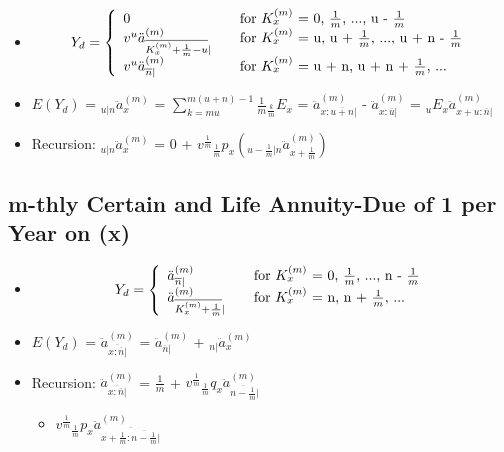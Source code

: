 \documentclass[]{book}
\providecommand{\tightlist}{%
  \setlength{\itemsep}{0pt}\setlength{\parskip}{0pt}}
\begin{document}
\begin{itemize}
\item
  \[Y_d = \left\{
    \begin{array}{l l l}
      0                      & \quad \text{for $K^{(m)}_x$ = 0, $\frac{1}{m}$, ..., u - $\frac{1}{m}$}\\
      v^u \ddot{a}^{(m)}_{\overline{K^{(m)}_x + \frac{1}{m} - u}| }                 & \quad \text{for $K^{(m)}_x$ = u, u + $\frac{1}{m}$, ..., u + n - $\frac{1}{m}$}\\
      v^u \ddot{a}^{(m)}_{\overline{n}|}                       & \quad \text{for $K^{(m)}_x$ = u + n, u + n + $\frac{1}{m}$, ...}\\
    \end{array} \right.\]
\item
  \(E(Y_d)\) = \({}_{u|n}\ddot{a}^{(m)}_x\) =
  \(\sum^{m(u + n) - 1}_{k = mu} \frac{1}{m} {}_{\frac{k}{m}}E_x\) =
  \(\ddot{a}^{(m)}_{x :\overline{u + n}|}\) -
  \(\ddot{a}^{(m)}_{x :\overline{u}|}\) =
  \({}_{u}E_x\)\(\ddot{a}^{(m)}_{x + u:\overline{n}|}\)
\item
  Recursion: \({}_{u|n}\ddot{a}^{(m)}_x\) = 0 +
  \(v^{\frac{1}{m}}{}_{\frac{1}{m}}p_x({}_{u - \frac{1}{m}|n}\ddot{a}^{(m)}_{x + \frac{1}{m}})\)
\end{itemize}

\subsection{m-thly Certain and Life Annuity-Due of 1 per Year on
(x)}\label{m-thly-certain-and-life-annuity-due-of-1-per-year-on-x}

\begin{itemize}
\item
  \[Y_d = \left\{
    \begin{array}{l l}
      \ddot{a}^{(m)}_{\overline{n}|}               & \quad \text{for $K^{(m)}_x$ = 0, $\frac{1}{m}$, ..., n - $\frac{1}{m}$}\\
      \ddot{a}^{(m)}_{\overline{K^{(m)}_x + \frac{1}{m}}| }         & \quad \text{for $K^{(m)}_x$ = n, n + $\frac{1}{m}$, ...}\\
    \end{array} \right.\]
\item
  \(E(Y_d)\) = \(\ddot{a}^{(m)}_{\overline{x: \overline{n}|}}\) =
  \(\ddot{a}^{(m)}_{\overline{n}|}\) + \({}_{n|}\ddot{a}^{(m)}_x\)
\item
  Recursion: \(\ddot{a}^{(m)}_{\overline{x: \overline{n}|}}\) =
  \(\frac{1}{m}\) +
  \(v^{\frac{1}{m}}{}_{\frac{1}{m}}q_x\ddot{a}^{(m)}_{\overline{n - \frac{1}{m}}| }\)

  \begin{itemize}
  \tightlist
  \item
    \(v^{\frac{1}{m}}{}_{\frac{1}{m}}p_x\ddot{a}^{(m)}_{\overline{x + \frac{1}{m}: \overline{n - \frac{1}{m}}| }}\)
  \end{itemize}
\end{itemize}
\end{document}
